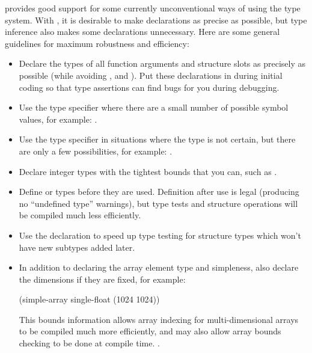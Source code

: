\python{} provides good support for some currently unconventional ways of
using the \clisp{} type system.  With \python{}, it is desirable to make
declarations as precise as possible, but type inference also makes
some declarations unnecessary.  Here are some general guidelines for
maximum robustness and efficiency:
\begin{itemize}
  
\item Declare the types of all function arguments and structure slots
  as precisely as possible (while avoiding ,  and
  ).  Put these declarations in during initial coding
  so that type assertions can find bugs for you during debugging.
  
\item Use the  type specifier where there are a small
  number of possible symbol values, for example: .
  
\item Use the  type specifier in situations where the
  type is not certain, but there are only a few possibilities, for
  example: .
  
\item Declare integer types with the tightest bounds that you can,
  such as .
  
\item Define  or  types before
  they are used.  Definition after use is legal (producing no
  ``undefined type'' warnings), but type tests and structure
  operations will be compiled much less efficiently.
  
\item Use the  declaration to speed up
  type testing for structure types which won't have new subtypes added
  later. 
  
\item In addition to declaring the array element type and simpleness,
  also declare the dimensions if they are fixed, for example:
  \begin{example}
    (simple-array single-float (1024 1024))
  \end{example}
  This bounds information allows array indexing for multi-dimensional
  arrays to be compiled much more efficiently, and may also allow
  array bounds checking to be done at compile time.
  .


\end{itemize}
